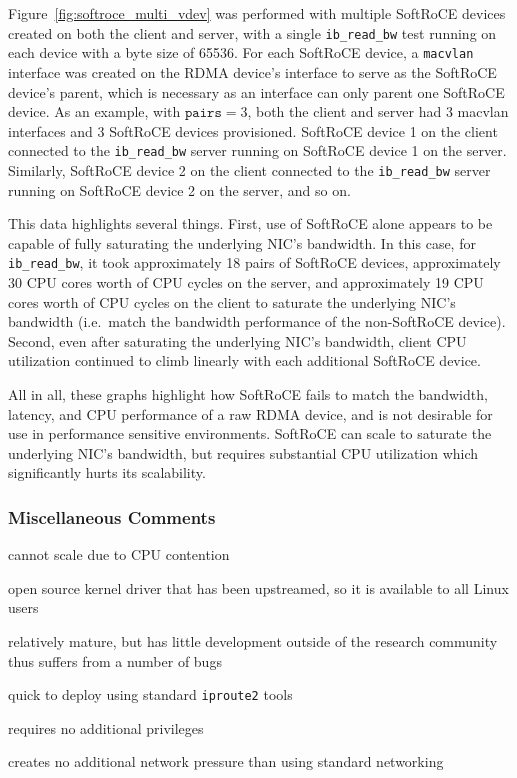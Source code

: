 \documentclass[12pt,titlepage]{article}
\begin{document}
Figure~\ref{fig:softroce_multi_vdev} was performed with multiple SoftRoCE devices created on both the client and server, with a single \texttt{ib\_read\_bw} test running on each device with a byte size of 65536.
For each SoftRoCE device, a \texttt{macvlan} interface was created on the RDMA device's interface to serve as the SoftRoCE device's parent, which is necessary as an interface can only parent one SoftRoCE device.
As an example, with $\texttt{pairs} = 3$, both the client and server had 3 macvlan interfaces and 3 SoftRoCE devices provisioned. 
SoftRoCE device 1 on the client connected to the \texttt{ib\_read\_bw} server running on SoftRoCE device 1 on the server.
Similarly, SoftRoCE device 2 on the client connected to the \texttt{ib\_read\_bw} server running on SoftRoCE device 2 on the server, and so on.

This data highlights several things.
First, use of SoftRoCE alone appears to be capable of fully saturating the underlying NIC's bandwidth.
In this case, for \texttt{ib\_read\_bw}, it took approximately 18 pairs of SoftRoCE devices, approximately 30 CPU cores worth of CPU cycles on the server, and approximately 19 CPU cores worth of CPU cycles on the client to saturate the underlying NIC's bandwidth (i.e.\ match the bandwidth performance of the non-SoftRoCE device).
Second, even after saturating the underlying NIC's bandwidth, client CPU utilization continued to climb linearly with each additional SoftRoCE device.

All in all, these graphs highlight how SoftRoCE fails to match the bandwidth, latency, and CPU performance of a raw RDMA device, and is not desirable for use in performance sensitive environments.
SoftRoCE can scale to saturate the underlying NIC's bandwidth, but requires substantial CPU utilization which significantly hurts its scalability.

\subsubsection*{Miscellaneous Comments}
\begin{description}[nolistsep,font={{\scshape\bfseries}}]
	\item[Scalability Limits] cannot scale due to CPU contention
	\item[Proprietary] open source kernel driver that has been upstreamed, so it is available to all Linux users
	\item[Maturity] relatively mature, but has little development outside of the research community thus suffers from a number of bugs~\cite{softrocedriver}
	\item[Ease in Deployment] quick to deploy using standard \texttt{iproute2} tools
	\item[Execution Privileges] requires no additional privileges
	\item[Network Pressure] creates no additional network pressure than using standard networking
\end{description}
\end{document}
